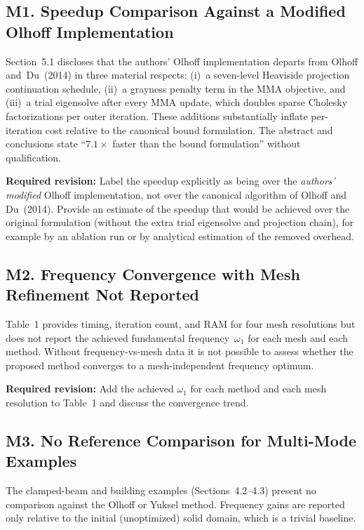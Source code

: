\documentclass[11pt,a4paper]{article}
\begin{document}
\subsection*{M1.\; Speedup Comparison Against a Modified Olhoff Implementation}

Section~5.1 discloses that the authors' Olhoff implementation departs from
Olhoff and~Du~(2014) in three material respects:
(i)~a seven-level Heaviside projection continuation schedule,
(ii)~a grayness penalty term in the MMA objective, and
(iii)~a trial eigensolve after every MMA update, which doubles sparse Cholesky
factorizations per outer iteration.
These additions substantially inflate per-iteration cost relative to the canonical bound
formulation. The abstract and conclusions state ``$7.1\times$ faster than the bound
formulation'' without qualification.

\textbf{Required revision:} Label the speedup explicitly as being over the \emph{authors'
modified} Olhoff implementation, not over the canonical algorithm of Olhoff and
Du~(2014). Provide an estimate of the speedup that would be achieved over the original
formulation (without the extra trial eigensolve and projection chain), for example by an
ablation run or by analytical estimation of the removed overhead.

\subsection*{M2.\; Frequency Convergence with Mesh Refinement Not Reported}

Table~1 provides timing, iteration count, and RAM for four mesh resolutions but does not
report the achieved fundamental frequency~$\omega_1$ for each mesh and each method.
Without frequency-vs-mesh data it is not possible to assess whether the proposed method
converges to a mesh-independent frequency optimum.

\textbf{Required revision:} Add the achieved $\omega_1$ for each method and each mesh
resolution to Table~1 and discuss the convergence trend.

\subsection*{M3.\; No Reference Comparison for Multi-Mode Examples}

The clamped-beam and building examples (Sections~4.2--4.3) present no comparison against
the Olhoff or Yuksel method. Frequency gains are reported only relative to the initial
(unoptimized) solid domain, which is a trivial baseline.
\end{document}
